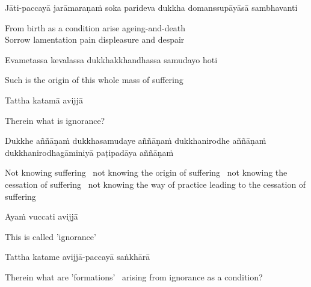 Jāti-paccayā jarāmaraṇaṁ soka parideva dukkha domanssupāyāsā sambhavanti

\begin{cprenglish}
  From birth as a condition arise ageing-and-death\\
  Sorrow lamentation pain displeasure and despair
\end{cprenglish}

Evametassa kevalassa dukkhakkhandhassa samudayo hoti

\begin{cprenglish}
  Such is the origin of this whole mass of suffering
\end{cprenglish}

Tattha katamā avijjā

\begin{cprenglish}
  Therein what is ignorance?
\end{cprenglish}

Dukkhe aññāṇaṁ dukkhasamudaye aññāṇaṁ dukkhanirodhe aññāṇaṁ dukkhanirodhagāminiyā paṭipadāya aññāṇaṁ

\begin{cprenglish}
  Not knowing suffering \breathmark\ not knowing the origin of suffering \breathmark\ not knowing the cessation of suffering \breathmark\ not knowing the way of practice leading to the cessation of suffering
\end{cprenglish}

Ayaṁ vuccati avijjā

\begin{cprenglish}
  This is called 'ignorance'
\end{cprenglish}

Tattha katame avijjā-paccayā saṅkhārā

\begin{cprenglish}
  Therein what are 'formations' \breathmark\ arising
  from ignorance as a condition?
\end{cprenglish}

